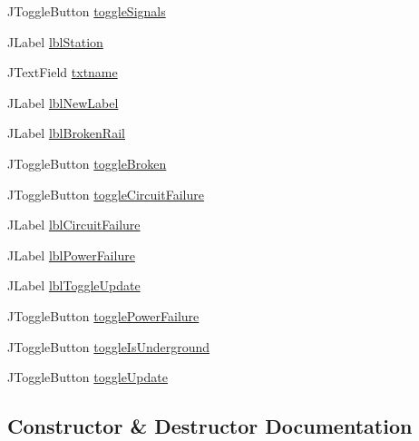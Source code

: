 \begin{DoxyCompactItemize}
\item 
J\+Toggle\+Button \hyperlink{classTrackModel_1_1TrackGUI_a1fe521ce42539dc1bcbccfb5ed41bbac}{toggle\+Signals}
\item 
J\+Label \hyperlink{classTrackModel_1_1TrackGUI_a7ccc784bfd3fdfde85c4fa8b739f2fcb}{lbl\+Station}
\item 
J\+Text\+Field \hyperlink{classTrackModel_1_1TrackGUI_a86ec145869a52d00f8d983f34bac90f1}{txtname}
\item 
J\+Label \hyperlink{classTrackModel_1_1TrackGUI_a505f3e3b26bcc339146f737a2a85eee5}{lbl\+New\+Label}
\item 
J\+Label \hyperlink{classTrackModel_1_1TrackGUI_a34a858d86011509dfca0ee2a86d36ded}{lbl\+Broken\+Rail}
\item 
J\+Toggle\+Button \hyperlink{classTrackModel_1_1TrackGUI_a3230a1046a2b3b8c66930a0bf8835919}{toggle\+Broken}
\item 
J\+Toggle\+Button \hyperlink{classTrackModel_1_1TrackGUI_a77c0d04ad9154f6a9ce658ec2a4fee75}{toggle\+Circuit\+Failure}
\item 
J\+Label \hyperlink{classTrackModel_1_1TrackGUI_aa11cdf9ec850c3a65799e91707a45f89}{lbl\+Circuit\+Failure}
\item 
J\+Label \hyperlink{classTrackModel_1_1TrackGUI_a1fb949d22e01b87afacfb088b5a2e8cd}{lbl\+Power\+Failure}
\item 
J\+Label \hyperlink{classTrackModel_1_1TrackGUI_a518c15d0e0683b93e65c44bd151a63db}{lbl\+Toggle\+Update}
\item 
J\+Toggle\+Button \hyperlink{classTrackModel_1_1TrackGUI_acf45b0c8d2150d15911a887d4677f7cb}{toggle\+Power\+Failure}
\item 
J\+Toggle\+Button \hyperlink{classTrackModel_1_1TrackGUI_ab6d7083fbc621edf4614fba49425f985}{toggle\+Is\+Underground}
\item 
J\+Toggle\+Button \hyperlink{classTrackModel_1_1TrackGUI_afcc0917c3720c4a4c594aab2a99c868c}{toggle\+Update}
\end{DoxyCompactItemize}


\subsection{Constructor \& Destructor Documentation}
\mbox{\label{classTrackModel_1_1TrackGUI_a9c9ef6bb307ee64e6eb01f881588f740}} 
